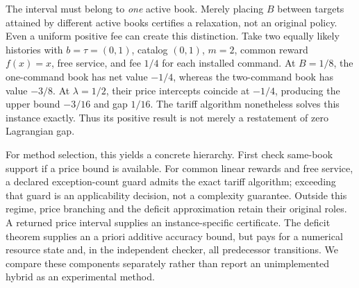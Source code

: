The interval must belong to \emph{one} active book. Merely placing $B$ between targets attained by different active books certifies a relaxation, not an original policy. Even a uniform positive fee can create this distinction. Take two equally likely histories with $b=\tau=(0,1)$, catalog $(0,1)$, $m=2$, common reward $f(x)=x$, free service, and fee $1/4$ for each installed command. At $B=1/8$, the one-command book has net value $-1/4$, whereas the two-command book has value $-3/8$. At $\lambda=1/2$, their price intercepts coincide at $-1/4$, producing the upper bound $-3/16$ and gap $1/16$. The tariff algorithm nonetheless solves this instance exactly. Thus its positive result is not merely a restatement of zero Lagrangian gap.

For method selection, this yields a concrete hierarchy. First check same-book support if a price bound is available. For common linear rewards and free service, a declared exception-count guard admits the exact tariff algorithm; exceeding that guard is an applicability decision, not a complexity guarantee. Outside this regime, price branching and the deficit approximation retain their original roles. A returned price interval supplies an instance-specific certificate. The deficit theorem supplies an a priori additive accuracy bound, but pays for a numerical resource state and, in the independent checker, all predecessor transitions. We compare these components separately rather than report an unimplemented hybrid as an experimental method.
